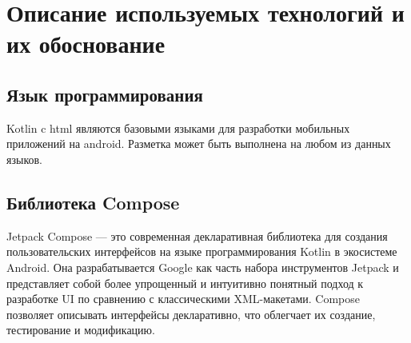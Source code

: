 \section{Описание используемых технологий и их обоснование}

\subsection{Язык программирования}

Kotlin c html являются базовыми языками для разработки мобильных приложений на android.
Разметка может быть выполнена на любом из данных языков.
\subsection{Библиотека Compose}

Jetpack Compose — это современная декларативная библиотека для создания пользовательских интерфейсов на языке
программирования Kotlin в экосистеме Android.
Она разрабатывается Google как часть набора инструментов Jetpack и представляет собой более упрощенный и
интуитивно понятный подход к разработке UI по сравнению с классическими XML-макетами.
Compose позволяет описывать интерфейсы декларативно, что облегчает их создание, тестирование и модификацию.

\clearpage
